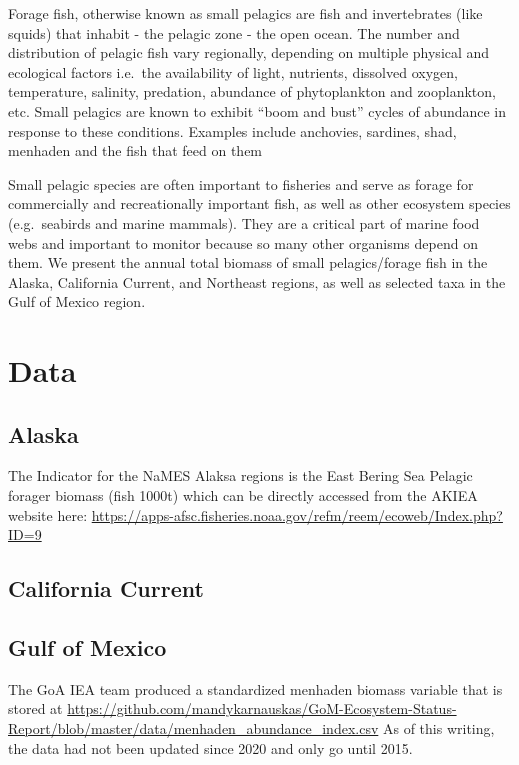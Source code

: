 \documentclass[
]{book}
\begin{document}
Forage fish, otherwise known as small pelagics are fish and invertebrates (like squids) that inhabit - the pelagic zone - the open ocean. The number and distribution of pelagic fish vary regionally, depending on multiple physical and ecological factors i.e.~the availability of light, nutrients, dissolved oxygen, temperature, salinity, predation, abundance of phytoplankton and zooplankton, etc. Small pelagics are known to exhibit ``boom and bust'' cycles of abundance in response to these conditions. Examples include anchovies, sardines, shad, menhaden and the fish that feed on them

Small pelagic species are often important to fisheries and serve as forage for commercially and recreationally important fish, as well as other ecosystem species (e.g.~seabirds and marine mammals). They are a critical part of marine food webs and important to monitor because so many other organisms depend on them. We present the annual total biomass of small pelagics/forage fish in the Alaska, California Current, and Northeast regions, as well as selected taxa in the Gulf of Mexico region.

\hypertarget{data-2}{%
\section{Data}\label{data-2}}

\hypertarget{alaska}{%
\subsection{Alaska}\label{alaska}}

The Indicator for the NaMES Alaksa regions is the East Bering Sea Pelagic forager biomass (fish 1000t) which can be directly accessed from the AKIEA website here: \url{https://apps-afsc.fisheries.noaa.gov/refm/reem/ecoweb/Index.php?ID=9}

\hypertarget{california-current}{%
\subsection{California Current}\label{california-current}}

\hypertarget{gulf-of-mexico}{%
\subsection{Gulf of Mexico}\label{gulf-of-mexico}}

The GoA IEA team produced a standardized menhaden biomass variable that is stored at \url{https://github.com/mandykarnauskas/GoM-Ecosystem-Status-Report/blob/master/data/menhaden_abundance_index.csv} As of this writing, the data had not been updated since 2020 and only go until 2015.
\end{document}
